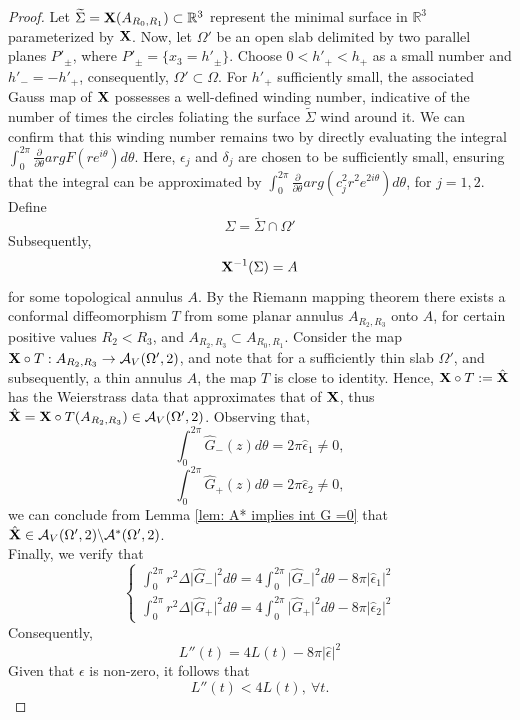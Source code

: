 \documentclass[11pt]{amsart}
\numberwithin{equation}{section}
\theoremstyle{theorem}
\theoremstyle{definition}
\numberwithin{equation}{section}
\begin{document}
\begin{proof}
    Let $\widetilde{\Sigma} = \bold{X} (A_{R_0,R_1})  \subset \mathbb{R}^3$
    represent the minimal surface in $\mathbb{R}^3$ parameterized by $\bold{X}$. Now, let $\Omega'$ be an open slab delimited by two parallel planes $P'_{\pm}$, where $P'_{\pm}=\{ x_3=h'_{\pm} \}$. Choose $0<h'_+ < h_+$ as a small number and $h'_-=-h'_+$, consequently, $\Omega' \subset \Omega$. For $h'_+$  sufficiently small, the associated Gauss map of $\bold{X}$ possesses a well-defined winding number, indicative of the number of times the circles foliating the surface $\widetilde{\Sigma}$ wind around it.
    We can confirm that this winding number remains two by directly evaluating the integral $\int_0^{2\pi} \frac{\partial}{\partial \theta} arg F(re^{i\theta}) d\theta$. Here, $\epsilon_j$ and $\delta_j$ are chosen to be sufficiently small, ensuring that the integral can be approximated by $\int_0^{2\pi} \frac{\partial}{\partial \theta} arg (c_j^2r^2e^{2i\theta}) d\theta$, for $j=1,2$. \\
  Define
$$
\Sigma = \widetilde{\Sigma} \cap \Omega'
$$
Subsequently,
$$
\bold{X}^{-1}(\Sigma) = A
$$
for some topological annulus $A$. By the Riemann mapping theorem there exists a conformal diffeomorphism $T$ from some planar annulus $A_{R_2,R_3}$ onto $A$, for certain positive values $R_2<R_3$, and $A_{R_2,R_3} \subset A_{R_0,R_1}$. Consider the map $\bold{X}\circ T: A_{R_2,R_3}\rightarrow \mathcal{A}_V(\Omega',2)$, and note that for a sufficiently thin slab $\Omega'$, and subsequently, a thin annulus $A$, the map $T$ is close to identity. Hence, $\bold{X}\circ T :=\hat{\bold{X}}$ has the Weierstrass data that approximates that of $\bold{X}$, thus $\hat{\bold{X}}=\bold{X}\circ T(A_{R_2,R_3})\in \mathcal{A}_V(\Omega',2)$.  
Observing that, 
$$
\int_0^{2\pi} \hat{G}_-(z)d\theta =2\pi \hat{\epsilon}_1 \neq 0,
$$
$$
\int_0^{2\pi} \hat{G}_+(z)d\theta =2\pi \hat{\epsilon}_2 \neq 0,
$$
we can conclude from Lemma \ref{lem: A* implies int G =0} that $\hat{\bold{X}} \in \mathcal{A}_V(\Omega',2) \backslash \mathcal{A}^*(\Omega',2)$.\\
Finally, we verify that
$$
\begin{cases}
    \int_0^{2\pi}r^2\Delta \vert \hat{G}_-\vert^2 d\theta =4\int_0^{2\pi} \vert \hat{G}_-\vert^2 d\theta -8\pi \vert \hat{\epsilon}_1 \vert^2 \\
    \int_0^{2\pi}r^2\Delta \vert \hat{G}_+\vert^2 d\theta =4\int_0^{2\pi} \vert \hat{G}_+\vert^2 d\theta -8\pi \vert \hat{\epsilon}_2 \vert^2
\end{cases}
$$
 Consequently,
 $$
 L''(t)=4L(t)-8\pi \vert \hat{\epsilon} \vert^2
 $$
 Given that $\epsilon$ is non-zero, it follows that 
 $$ L''(t)<4L(t),\ \forall t.$$
\end{proof}
\end{document}
